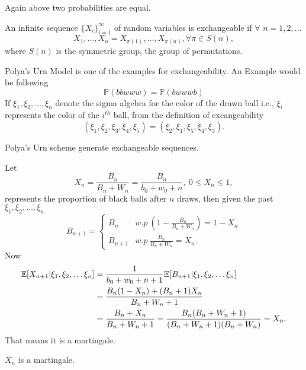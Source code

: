 \documentclass[a4paper,english,10pt]{article}
\begin{document}
Again above two probabilities are equal.
\begin{defn}
An infinite sequence $\{X_i\}_{i=1}^{\infty}$ of random variables is exchangeable if $\forall$ $n=1,2,\dots$
 \begin{equation*}
X_1,\dots,X_n=X_{\pi(1)},\dots ,X_{\pi(n)}, \forall \pi \in S(n),
\end{equation*}
where $S(n)$ is the symmetric group, the group of permutations.
\end{defn}
Polya's Urn Model is one of the examples for exchangeability. An Example would be following
 \begin{equation*}
\mathbb{P}(bbwww)=\mathbb{P}(bwwwb)
\end{equation*}
If $\xi_1,\xi_2,\dots,\xi_n$ denote the sigma algebra for the color of the drawn ball i.e., $\xi_i$ represents the color of the $i^{th}$ ball, from the definition of excangeability
\begin{equation*}
(\xi_1,\xi_2,\xi_3,\xi_4,\xi_5)=(\xi_2,\xi_1,\xi_5,\xi_4,\xi_3).
\end{equation*}
\begin{note}
Polya's Urn scheme generate exchangeable sequences.
\end{note}
Let 
\begin{equation*}
X_n=\frac{B_n}{B_n+W_n}=\frac{B_n}{b_0+w_0+n},\ 0\leq X_n \leq1,
\end{equation*}
represents the proportion of black balls after $n$ draws, then given the past $\xi_1,\xi_2,\dots,\xi_n$
\begin{equation*}
B_{n+1} = \begin{cases}
B_n  & w.p \ (1-\frac{B_n}{B_n+W_n}) = 1 -X_n \\
B_{n+1} & %
w.p \ \frac{B_n}{B_n+W_n} = X_n.
\end{cases}
\end{equation*}
Now
\begin{align*}
\mathbb{E}[X_{n+1}|\xi_1,\xi_2,\dots\xi_n]&=\frac{1}{b_0+w_0+n+1}\mathbb{E}[B_{n+1}|\xi_1,\xi_2,\dots\xi_n]\\
&=\frac{B_n(1-X_n)+(B_n+1)X_n}{B_n+W_n+1}\\
&=\frac{B_n+X_n}{B_n+W_n+1} = \frac{B_n(B_n+W_n+1)}{(B_n+W_n+1)(B_n+W_n)}=X_n.
\end{align*}
That means it is a martingale.
\begin{note}
$X_n$ is a martingale.
\end{note}
\end{document}
